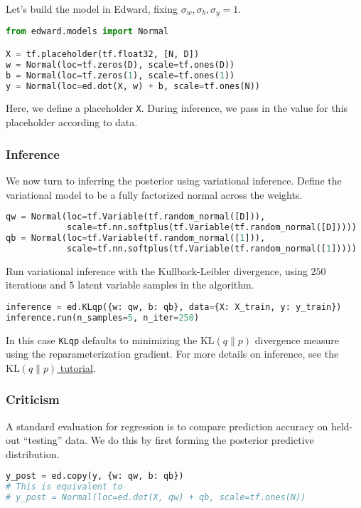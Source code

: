 Let's build the model in Edward, fixing $\sigma_w,\sigma_b,\sigma_y=1$.
\begin{lstlisting}[language=Python]
from edward.models import Normal

X = tf.placeholder(tf.float32, [N, D])
w = Normal(loc=tf.zeros(D), scale=tf.ones(D))
b = Normal(loc=tf.zeros(1), scale=tf.ones(1))
y = Normal(loc=ed.dot(X, w) + b, scale=tf.ones(N))
\end{lstlisting}
Here, we define a placeholder \texttt{X}. During inference, we pass in
the value for this placeholder according to data.

\subsubsection{Inference}

We now turn to inferring the posterior using variational inference.
Define the variational model to be a fully factorized normal across
the weights.
\begin{lstlisting}[language=Python]
qw = Normal(loc=tf.Variable(tf.random_normal([D])),
            scale=tf.nn.softplus(tf.Variable(tf.random_normal([D]))))
qb = Normal(loc=tf.Variable(tf.random_normal([1])),
            scale=tf.nn.softplus(tf.Variable(tf.random_normal([1]))))
\end{lstlisting}

Run variational inference with the Kullback-Leibler divergence, using
$250$ iterations and $5$ latent variable samples in the algorithm.
\begin{lstlisting}[language=Python]
inference = ed.KLqp({w: qw, b: qb}, data={X: X_train, y: y_train})
inference.run(n_samples=5, n_iter=250)
\end{lstlisting}
In this case \texttt{KLqp} defaults to minimizing the
$\text{KL}(q\|p)$ divergence measure using the reparameterization
gradient.
For more details on inference, see the \href{/tutorials/klqp}{$\text{KL}(q\|p)$ tutorial}.

\subsubsection{Criticism}

A standard evaluation for regression is to compare prediction accuracy on
held-out ``testing'' data. We do this by first forming the posterior predictive
distribution.
\begin{lstlisting}[language=Python]
y_post = ed.copy(y, {w: qw, b: qb})
# This is equivalent to
# y_post = Normal(loc=ed.dot(X, qw) + qb, scale=tf.ones(N))
\end{lstlisting}

